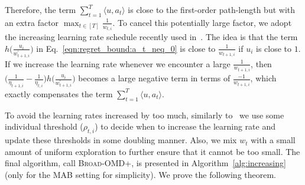 \documentclass[final, 12pt]{colt2018} %
\newcommand{\p}{\prime}
\newcommand{\inn}[1]{ \langle {#1} \rangle }
\begin{document}

Therefore, the term $\sum_{t=1}^T \inn{u,a_t}$ is close to the first-order path-length but with an extra factor $\max_{t\in[T]} \frac{1}{w_{t,i}}$.
To cancel this potentially large factor, we adopt the increasing learning rate schedule recently used in~\citep{agarwal2017corralling}. 
The idea is that the term $h\big(\frac{u_i}{w_{t+1,i}^\p}\big)$ in Eq.~\eqref{eqn:regret_bound:a_t_neq_0} is close to $\frac{1}{w_{t+1,i}}$ if $u_i$ is close to $1$.
If we increase the learning rate whenever we encounter a large $\frac{1}{w_{t+1,i}}$, 
then $\Big(\frac{1}{\eta_{t+1,i}}-\frac{1}{\eta_{t,i}}\Big)h\Big(\frac{u_i}{w_{t+1,i}^\p}\Big)$ becomes a large negative term in terms of $\frac{-1}{w_{t+1,i}}$,
which exactly compensates the term $\sum_{t=1}^T \inn{u,a_t}$.

To avoid the learning rates increased by too much, 
similarly to~\citep{agarwal2017corralling} we use some individual threshold ($\rho_{t,i}$) to decide when to increase the learning rate
and update these thresholds in some doubling manner. 
Also, we mix $w_t$ with a small amount of uniform exploration to further ensure that it cannot be too small.
The final algorithm, call \textsc{Broad-OMD+}, is presented in Algorithm~\ref{alg:increasing} (only for the MAB setting for simplicity).
We prove the following theorem.
\end{document}
